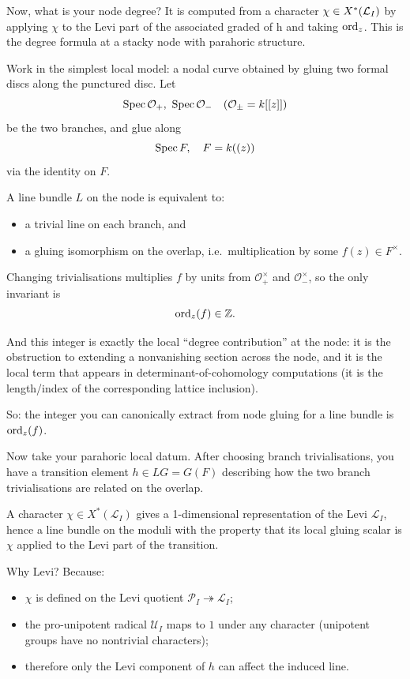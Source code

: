\documentclass[12pt]{article}
\begin{document}
\begin{remark}
     Now, what is your node degree? It is computed from a character \(\chi\in X^*({\mathcal{L}}_I)\) by applying $\chi$ to the Levi part of the associated graded of h and taking \(\operatorname{ord}_z\).
This is the degree formula at a stacky node with parahoric structure.


Work in the simplest local model: a nodal curve obtained by gluing two formal discs along the punctured disc. Let
\[
\operatorname{Spec} \mathcal{O}_+,\ \operatorname{Spec} \mathcal{O}_- \quad (\mathcal{O}_\pm = k[[z]])
\]
be the two branches, and glue along
\[
\operatorname{Spec} F,\quad F=k((z))
\]
via the identity on $F$.

A line bundle $L$ on the node is equivalent to:
\begin{itemize}
    \item a trivial line on each branch, and
    \item a gluing isomorphism on the overlap, i.e.\ multiplication by some $f(z)\in F^\times$.
\end{itemize}

Changing trivialisations multiplies $f$ by units from $\mathcal{O}_+^\times$ and $\mathcal{O}_-^\times$, so the only invariant is
\[
\operatorname{ord}_z(f)\in\mathbb{Z}.
\]

And this integer is exactly the local ``degree contribution'' at the node: it is the obstruction to extending a nonvanishing section across the node, and it is the local term that appears in determinant-of-cohomology computations (it is the length/index of the corresponding lattice inclusion).

So: the integer you can canonically extract from node gluing for a line bundle is $\operatorname{ord}_z(f)$.

Now take your parahoric local datum. After choosing branch trivialisations, you have a transition element $h\in LG=G(F)$ describing how the two branch trivialisations are related on the overlap.

A character $\chi\in X^*(\mathcal{L}_I)$ gives a 1-dimensional representation of the Levi $\mathcal{L}_I$, hence a line bundle on the moduli with the property that its local gluing scalar is $\chi$ applied to the Levi part of the transition.

Why Levi? Because:
\begin{itemize}
    \item $\chi$ is defined on the Levi quotient $\mathcal{P}_I\twoheadrightarrow \mathcal{L}_I$;
    \item the pro-unipotent radical $\mathcal{U}_I$ maps to $1$ under any character (unipotent groups have no nontrivial characters);
    \item therefore only the Levi component of $h$ can affect the induced line.
\end{itemize}


\end{remark}
\end{document}
